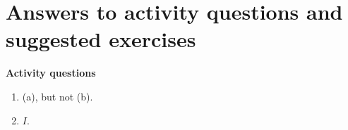 \documentclass[12pt]{article}
\begin{document}
\section{Answers to activity questions and suggested exercises}
\label{answers3}

{\bf Activity questions}

\bigskip

\noindent {\bf \ref{ssec.definv}:}
\begin{enumerate}
\item (a), but not (b).
\item $I$.
\end{enumerate}

\bigskip

\noindent {\bf \ref{ssec.findinv}:}
\end{document}
